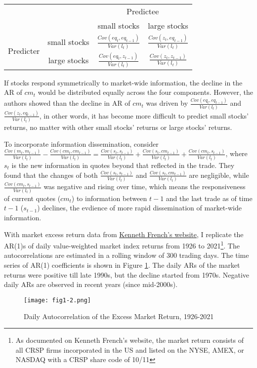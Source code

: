 \begin{enumerate}
    \begin{center}
        \begin{tabular}{cccc} 
        \hline
        & & \multicolumn{2}{c}{Predictee} \\
        & &small stocks & large stocks\\
        \hline
        \multirow{2}{4em}{Predicter} & small stocks & $\frac{Cov(eq_t,eq_{t-1})}{Var(l_t)}$ & $\frac{Cov(z_t,eq_{t-1})}{Var(l_t)}$ \\ 
        & large stocks & $\frac{Cov(eq_t,z_{t-1})}{Var(l_t)}$ & $\frac{Cov(z_t,z_{t-1})}{Var(l_t)}$ \\ 
        \hline
        \end{tabular}
    \end{center}

    If stocks respond symmetrically to market-wide information, the decline in the AR of $cm_t$ would be distributed equally across the four components. However, the authors showed than the decline in AR of $cm_t$ was driven by $\frac{Cov(eq_t,eq_{t-1})}{Var(l_t)}$ and $\frac{Cov(z_t,eq_{t-1})}{Var(l_t)}$,
    in other words, it has become more difficult to predict small stocks' returns, no matter with other small stocks' returns or large stocks' returns. 
    
    To incorporate information dissemination, consider $\frac{Cov(m_t,m_{t-1})}{Var(l_t)}-\frac{Cov(cm_t,cm_{t-1})}{Var(l_t)} = \frac{Cov(s_t,s_{t-1})}{Var(l_t)}+\frac{Cov(s_t,cm_{t-1})}{Var(l_t)}+\frac{Cov(cm_t,s_{t-1})}{Var(l_t)}$, where $s_t$ is the new information in quotes beyond that reflected in the trade. They found that
    the changes of both $\frac{Cov(s_t,s_{t-1})}{Var(l_t)}$ and $\frac{Cov(s_t,cm_{t-1})}{Var(l_t)}$ are negligible, while $\frac{Cov(cm_t,s_{t-1})}{Var(l_t)}$ was negative and rising over time, which means the responsiveness of current quotes ($cm_t$) to information between $t-1$ and the last trade as of time $t-1$ ($s_{t-1}$) declines,
    the evdience of more rapid dissemination of market-wide information.
\end{enumerate}

With market excess return data from \href{https://mba.tuck.dartmouth.edu/pages/faculty/ken.french/data_library.html}{Kenneth French's website}, I replicate the AR(1)s of daily value-weighted market index returns from 1926 to 2021\footnote{As documented on Kenneth French's website, the market return consists of all CRSP firms incorporated in the US and listed on the NYSE, AMEX, or NASDAQ with a CRSP share code of 10/11}.
The autocorrelations are estimated in a rolling window of 300 trading days. The time series of AR(1) coefficients is shown in Figure \ref{fig1-2}. The daily ARs of the market returns were positive till late 1990s, but the decline started from 1970s. Negative daily ARs are observed in recent years (since mid-2000s). 

\begin{figure}[ht]
    \texttt{[image: fig1-2.png]}
    \centering
    \caption{Daily Autocorrelation of the Excess Market Return, 1926-2021}\label{fig1-2}
\end{figure}